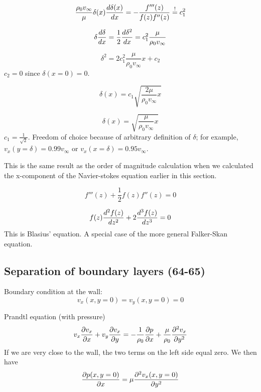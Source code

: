 \begin{equation}
\frac{\rho_0 v_\infty}{\mu} \delta(x) \frac{d \delta(x)}{d x} = -\frac{f'''(z)}{f(z)f''(z)} \overset{!}{=} c_1^2
\end{equation}

\begin{equation}
\delta\frac{d \delta}{d x} = \frac{1}{2}\frac{d \delta^2}{d x} = c_1^2\frac{\mu}{\rho_0v_\infty}\\
\end{equation}

\begin{equation}
\delta^2 = 2c_1^2 \frac{\mu}{\rho_0v_\infty}x + c_2
\end{equation}
$c_2=0$ since $\delta(x=0)=0$.

\begin{equation}
\delta(x) = c_1\sqrt{\frac{2\mu}{\rho_0v_\infty}x}
\end{equation}

\begin{equation}
\delta(x)=\sqrt{\frac{\mu}{\rho_0v_\infty}x}
\end{equation}
$c_1=\frac{1}{\sqrt{2}}$. Freedom of choice because of arbitrary definition of $\delta$; for example, $v_x(y=\delta)=0.99v_\infty$ or $v_x(x=\delta)=0.95v_\infty$.

This is the same result as the order of magnitude calculation when we calculated the x-component of the Navier-stokes equation earlier in this section.

\begin{equation}
f'''(z) +\frac{1}{2} f(z)f''(z) = 0
\end{equation}

\begin{equation}
f(z)\frac{d^2 f(z)}{d z^2}+2\frac{d^3 f(z)}{d z^3}=0
\end{equation}
This is Blasius' equation. A special case of the more general Falker-Skan equation.


\subsection{Separation of boundary layers (64-65)}

Boundary condition at the wall:
\begin{equation}
v_x(x,y=0) = v_y(x,y=0)=0
\end{equation}

Prandtl equation (with pressure)
\begin{equation}
v_x\frac{\partial v_x}{\partial x}+v_y\frac{\partial v_x}{\partial y} = -\frac{1}{\rho_0}\frac{\partial p}{\partial x}+\frac{\mu}{\rho_0}\frac{\partial^2 v_x}{\partial y^2}
\end{equation}
If we are very close to the wall, the two terms on the left side equal zero. We then have
\begin{equation}
\frac{\partial p(x,y=0)}{\partial x}=\mu\frac{\partial^2 v_x(x,y=0)}{\partial y^2}
\end{equation}

